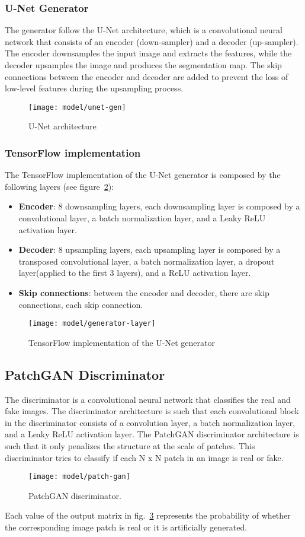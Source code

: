 \subsubsection{U-Net Generator}
The generator follow the U-Net architecture, which is a convolutional neural network that
consists of an encoder (down-sampler) and a decoder (up-sampler). The encoder downsamples the
input image and extracts the features, while the decoder upsamples the image and produces
the segmentation map. The skip connections between the encoder and decoder are added to
prevent the loss of low-level features during the upsampling process.
\begin{figure}[H]
    \centering
    \texttt{[image: model/unet-gen]}
    \caption{U-Net architecture}\label{fig:unet}
\end{figure}
\subsubsection{TensorFlow implementation}
The TensorFlow implementation of the U-Net generator is composed by the following layers (see figure~\ref{fig:gen-layer}):
\begin{itemize}
    \item \textbf{Encoder}: 8 downsampling layers, each downsampling layer is composed by a convolutional layer, a batch normalization layer, and a Leaky ReLU activation layer.
    \item \textbf{Decoder}: 8 upsampling layers, each upsampling layer is composed by a transposed convolutional layer, a batch normalization layer, a dropout layer(applied to the first 3 layers), and a ReLU activation layer.
    \item \textbf{Skip connections}: between the encoder and decoder, there are skip connections, each skip connection.
\end{itemize}
\begin{figure}[H]
    \centering
    \texttt{[image: model/generator-layer]}
    \caption{TensorFlow implementation of the U-Net generator}\label{fig:gen-layer}
\end{figure}
\subsection{PatchGAN Discriminator}\label{subsec:patchgan-discriminator}
The discriminator is a convolutional neural network that classifies the real and fake
images. The discriminator architecture is such that each convolutional block in the
discriminator consists of a convolution layer, a batch normalization layer, and a Leaky
ReLU activation layer. The PatchGAN discriminator architecture is such that it only penalizes
the structure at the scale of patches. This discriminator tries to classify if each N x N
patch in an image is real or fake.
\begin{figure}[H]
    \centering
    \texttt{[image: model/patch-gan]}
    \caption{PatchGAN discriminator.}\label{fig:patchgan}
\end{figure}
Each value of the output matrix in fig.~\ref*{fig:patchgan} represents the probability of whether the corresponding image patch is real or it is artificially generated.
